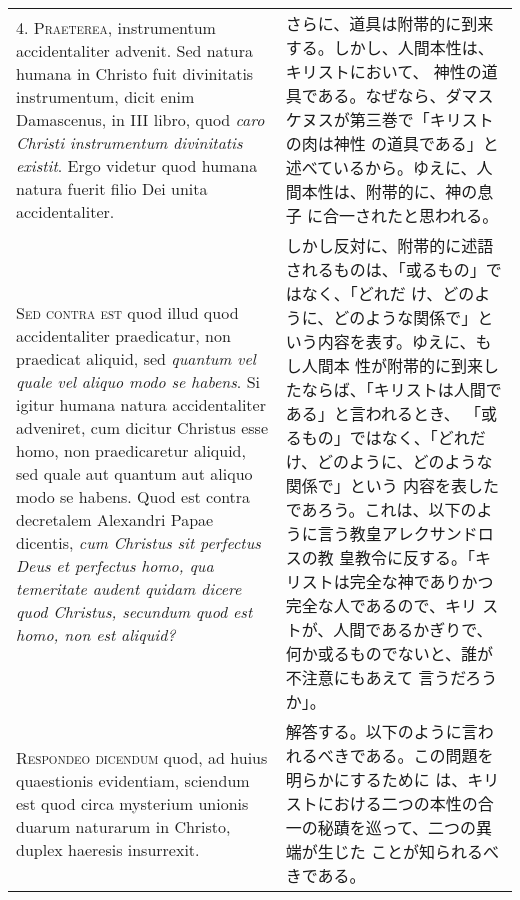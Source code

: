 \documentclass[10pt]{jsarticle} %
\begin{document}
\begin{longtable}{p{21em}p{21em}}
\\



4. {\scshape Praeterea}, instrumentum accidentaliter advenit. Sed
natura humana in Christo fuit divinitatis instrumentum, dicit enim
Damascenus, in III libro, quod {\itshape caro Christi instrumentum
divinitatis existit}. Ergo videtur quod humana natura fuerit filio Dei
unita accidentaliter.

&

さらに、道具は附帯的に到来する。しかし、人間本性は、キリストにおいて、
神性の道具である。なぜなら、ダマスケヌスが第三巻で「キリストの肉は神性
の道具である」と述べているから。ゆえに、人間本性は、附帯的に、神の息子
に合一されたと思われる。


\\



{\scshape Sed contra est} quod illud quod accidentaliter praedicatur,
non praedicat aliquid, sed {\itshape quantum vel quale vel aliquo modo
se habens}. Si igitur humana natura accidentaliter adveniret, cum
dicitur Christus esse homo, non praedicaretur aliquid, sed quale aut
quantum aut aliquo modo se habens. Quod est contra decretalem
Alexandri Papae dicentis, {\itshape cum Christus sit perfectus Deus et
perfectus homo, qua temeritate audent quidam dicere quod Christus,
secundum quod est homo, non est aliquid?}

&


しかし反対に、附帯的に述語されるものは、「或るもの」ではなく、「どれだ
け、どのように、どのような関係で」という内容を表す。ゆえに、もし人間本
性が附帯的に到来したならば、「キリストは人間である」と言われるとき、
「或るもの」ではなく、「どれだけ、どのように、どのような関係で」という
内容を表したであろう。これは、以下のように言う教皇アレクサンドロスの教
皇教令に反する。「キリストは完全な神でありかつ完全な人であるので、キリ
ストが、人間であるかぎりで、何か或るものでないと、誰が不注意にもあえて
言うだろうか」。

\\



{\scshape Respondeo dicendum} quod, ad huius quaestionis evidentiam,
sciendum est quod circa mysterium unionis duarum naturarum in Christo,
duplex haeresis insurrexit.

&

解答する。以下のように言われるべきである。この問題を明らかにするために
は、キリストにおける二つの本性の合一の秘蹟を巡って、二つの異端が生じた
ことが知られるべきである。


\end{longtable}
\end{document}
